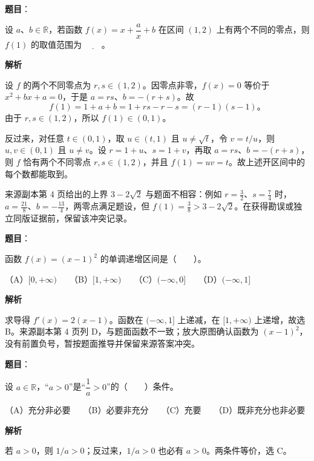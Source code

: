 \begin{answer}

\textbf{题目}：

设 $a\text{、}b\in\mathbb R$，若函数 $f(x)=x+\dfrac ax+b$ 在区间 $(1,2)$ 上有两个不同的零点，则 $f(1)$ 的取值范围为 $\underline{\qquad}$。

\textbf{解析}

设 $f$ 的两个不同零点为 $r,s\in(1,2)$。因零点非零，$f(x)=0$ 等价于 $x^2+bx+a=0$，于是 $a=rs$、$b=-(r+s)$。故
\nopagebreak[4]
\[
f(1)=1+a+b=1+rs-r-s=(r-1)(s-1)\text{。}
\]
由于 $r,s\in(1,2)$，所以 $f(1)\in(0,1)$。

反过来，对任意 $t\in(0,1)$，取 $u\in(t,1)$ 且 $u\ne\sqrt t$，令 $v=t/u$，则 $u,v\in(0,1)$ 且 $u\ne v$。设 $r=1+u$、$s=1+v$，再取 $a=rs$、$b=-(r+s)$，则 $f$ 恰有两个不同零点 $r,s\in(1,2)$，并且 $f(1)=uv=t$。故上述开区间中的每个数都能取到。

来源副本第 4 页给出的上界 $3-2\sqrt2$ 与题面不相容：例如 $r=\frac32$、$s=\frac74$ 时，$a=\frac{21}8$、$b=-\frac{13}4$，两零点满足题设，但 $f(1)=\frac38>3-2\sqrt2$。在获得勘误或独立同版证据前，保留该冲突记录。


\end{answer}
\begin{answer}

\textbf{题目}：

函数 $f(x)=(x-1)^2$ 的单调递增区间是\mbox{（　　）}。

（A）$[0,+\infty)$　　（B）$[1,+\infty)$　　（C）$(-\infty,0]$　　（D）$(-\infty,1]$

\textbf{解析}

求导得 $f'(x)=2(x-1)$。函数在 $(-\infty,1]$ 上递减，在 $[1,+\infty)$ 上递增，故选 B。来源副本第 4 页列 D，与题面函数不一致；放大原图确认函数为 $(x-1)^2$，没有前置负号，暂按题面推导并保留来源答案冲突。


\end{answer}
\begin{answer}

\textbf{题目}：

设 $a\in\mathbb R$，“$a>0$”是“$\dfrac1a>0$”的\mbox{（　　）}条件。

（A）充分非必要　　（B）必要非充分　　（C）充要　　（D）既非充分也非必要

\textbf{解析}

若 $a>0$，则 $1/a>0$；反过来，$1/a>0$ 也必有 $a>0$。两条件等价，选 C。


\end{answer}
